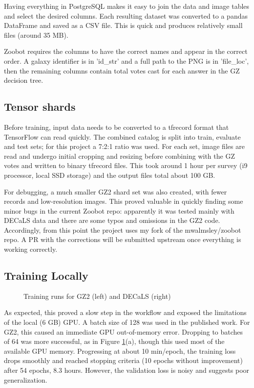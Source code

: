 \documentclass[preprint]{aastex631}
\begin{document}
Having everything in PostgreSQL makes it easy to join the data and image tables and select the desired columns. Each resulting dataset was converted to a pandas DataFrame and saved as a CSV file. This is quick and produces relatively small files (around 35 MB).

Zoobot requires the columns to have the correct names and appear in the correct order. A galaxy identifier is in 'id\_str' and a full path to the PNG is in 'file\_loc', then the remaining columns contain total votes cast for each answer in the GZ decision tree.

\subsection{Tensor shards} \label{shards}

Before training, input data needs to be converted to a tfrecord format that TensorFlow can read quickly. The combined catalog is split into train, evaluate and test sets; for this project a 7:2:1 ratio was used. For each set, image files are read and undergo initial cropping and resizing before combining with the GZ votes and written to binary tfrecord files. This took around 1 hour per survey (i9 processor, local SSD storage) and the output files total about 100 GB.

For debugging, a much smaller GZ2 shard set was also created, with fewer records and low-resolution images. This proved valuable in quickly finding some minor bugs in the current Zoobot repo: apparently it was tested mainly with DECaLS data and there are some typos and omissions in the GZ2 code. Accordingly, from this point the project uses my fork of the mwalmsley/zoobot repo. A PR with the corrections will be submitted upstream once everything is working correctly.

\subsection{Training Locally}

\begin{figure}[h!]
	\caption{Training runs for GZ2 (left) and DECaLS (right) \label{fig:train_plots}}
\end{figure}

As expected, this proved a slow step in the workflow and exposed the limitations of the local (6 GB) GPU. A batch size of 128 was used in the published work. For GZ2, this caused an immediate GPU out-of-memory error. Dropping to batches of 64 was more successful, as in Figure \ref{fig:train_plots}(a), though this used most of the available GPU memory. Progressing at about 10 min/epoch, the training loss drops smoothly and reached stopping criteria (10 epochs without improvement) after 54 epochs, 8.3 hours. However, the validation loss is noisy and suggests poor generalization.
\end{document}
